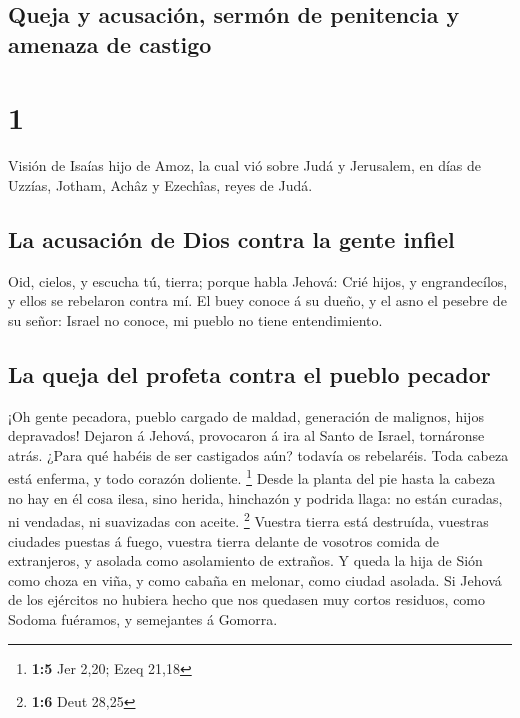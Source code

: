 \hypertarget{queja-y-acusaciuxf3n-sermuxf3n-de-penitencia-y-amenaza-de-castigo}{%
\subsection{Queja y acusación, sermón de penitencia y amenaza de
castigo}\label{queja-y-acusaciuxf3n-sermuxf3n-de-penitencia-y-amenaza-de-castigo}}

\hypertarget{section}{%
\section{1}\label{section}}

 Visión de Isaías hijo de Amoz, la cual vió sobre Judá y
Jerusalem, en días de Uzzías, Jotham, Achâz y Ezechîas, reyes de Judá.

\hypertarget{la-acusaciuxf3n-de-dios-contra-la-gente-infiel}{%
\subsection{La acusación de Dios contra la gente
infiel}\label{la-acusaciuxf3n-de-dios-contra-la-gente-infiel}}

 Oid, cielos, y escucha tú, tierra; porque habla Jehová:
Crié hijos, y engrandecílos, y ellos se rebelaron contra mí.
 El buey conoce á su dueño, y el asno el pesebre de su
señor: Israel no conoce, mi pueblo no tiene entendimiento.

\hypertarget{la-queja-del-profeta-contra-el-pueblo-pecador}{%
\subsection{La queja del profeta contra el pueblo
pecador}\label{la-queja-del-profeta-contra-el-pueblo-pecador}}

 ¡Oh gente pecadora, pueblo cargado de maldad, generación
de malignos, hijos depravados! Dejaron á Jehová, provocaron á ira al
Santo de Israel, tornáronse atrás.  ¿Para qué habéis de
ser castigados aún? todavía os rebelaréis. Toda cabeza está enferma, y
todo corazón doliente. \footnote{\textbf{1:5} Jer 2,20; Ezeq 21,18}
 Desde la planta del pie hasta la cabeza no hay en él cosa
ilesa, sino herida, hinchazón y podrida llaga: no están curadas, ni
vendadas, ni suavizadas con aceite. \footnote{\textbf{1:6} Deut 28,25}
 Vuestra tierra está destruída, vuestras ciudades puestas
á fuego, vuestra tierra delante de vosotros comida de extranjeros, y
asolada como asolamiento de extraños.  Y queda la hija de
Sión como choza en viña, y como cabaña en melonar, como ciudad asolada.
 Si Jehová de los ejércitos no hubiera hecho que nos
quedasen muy cortos residuos, como Sodoma fuéramos, y semejantes á
Gomorra.

